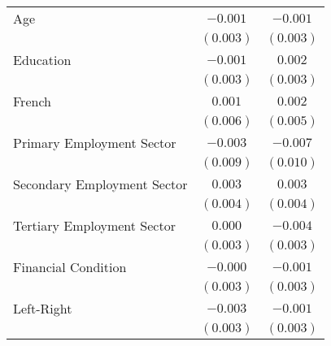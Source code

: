 \begin{center}
\begin{tiny}
\begin{longtable}{l@{} c@{} c@{}}
\quad Age                                                                            & $-0.001$        & $-0.001$         \\
                                                                                     & $(0.003)$       & $(0.003)$        \\
\quad Education                                                                      & $-0.001$        & $0.002$          \\
                                                                                     & $(0.003)$       & $(0.003)$        \\
\quad French                                                                         & $0.001$         & $0.002$          \\
                                                                                     & $(0.006)$       & $(0.005)$        \\
\quad Primary Employment Sector                                                      & $-0.003$        & $-0.007$         \\
                                                                                     & $(0.009)$       & $(0.010)$        \\
\quad Secondary Employment Sector                                                    & $0.003$         & $0.003$          \\
                                                                                     & $(0.004)$       & $(0.004)$        \\
\quad Tertiary Employment Sector                                                     & $0.000$         & $-0.004$         \\
                                                                                     & $(0.003)$       & $(0.003)$        \\
\quad Financial Condition                                                            & $-0.000$        & $-0.001$         \\
                                                                                     & $(0.003)$       & $(0.003)$        \\
\quad Left-Right                                                                     & $-0.003$        & $-0.001$         \\
                                                                                     & $(0.003)$       & $(0.003)$        \\

\end{longtable}
\end{tiny}
\end{center}
